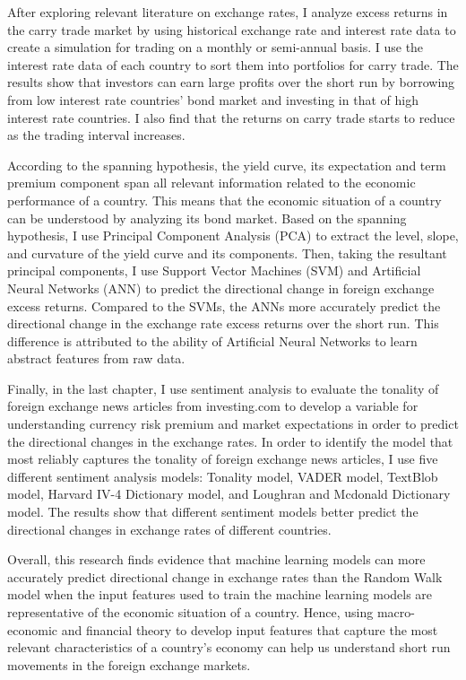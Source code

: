 \documentclass[12pt, a4paper]{report}
\begin{document}
\vspace*{3mm}

After exploring relevant literature on exchange rates, I analyze excess returns in the carry trade market by using historical exchange rate and interest rate data to create a simulation for trading on a monthly or semi-annual basis. I use the interest rate data of each country to sort them into portfolios for carry trade. The results show that investors can earn large profits over the short run by borrowing from low interest rate countries' bond market and investing in that of high interest rate countries. I also find that the returns on carry trade starts to reduce as the trading interval increases.

\vspace*{3mm}

According to the spanning hypothesis, the yield curve, its expectation and term premium component span all relevant information related to the economic performance of a country. This means that the economic situation of a country can be understood by analyzing its bond market. Based on the spanning hypothesis, I use Principal Component Analysis (PCA) to extract the level, slope, and curvature of the yield curve and its components. Then, taking the resultant principal components, I use Support Vector Machines (SVM) and Artificial Neural Networks (ANN) to predict the directional change in foreign exchange excess returns. Compared to the SVMs, the ANNs more accurately predict the directional change in the exchange rate excess returns over the short run. This difference is attributed to the ability of Artificial Neural Networks to learn abstract features from raw data.

\vspace*{3mm}

Finally, in the last chapter, I use sentiment analysis to evaluate the tonality of foreign exchange news articles from investing.com to develop a variable for understanding currency risk premium and market expectations in order to predict the directional changes in the exchange rates. In order to identify the model that most reliably captures the tonality of foreign exchange news articles, I use five different sentiment analysis models: Tonality model, VADER model, TextBlob model, Harvard IV-4 Dictionary model, and Loughran and Mcdonald Dictionary model. The results show that different sentiment models better predict the directional changes in exchange rates of different countries.

\vspace*{3mm}
Overall, this research finds evidence that machine learning models can more accurately predict directional change in exchange rates than the Random Walk model when the input features used to train the machine learning models are representative of the economic situation of a country. Hence, using macro-economic and financial theory to develop input features that capture the most relevant characteristics of a country's economy can help us understand short run movements in the foreign exchange markets.
\end{document}
